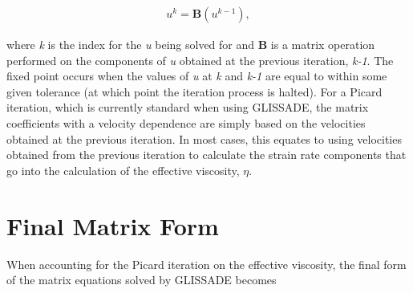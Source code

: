 \begin{align*}
u^{k}=\mathbf{B}\left( u^{k-1} \right),
\end{align*}

where \textit{k} is the index for the \textit{u} being solved for and \textbf{B} is a matrix operation performed on the components of \textit{u} obtained at the previous iteration, \textit{k-1}. The fixed point occurs when the values of \textit{u} at \textit{k} and \textit{k-1} are equal to within some given tolerance (at which point the iteration process is halted). %
For a Picard iteration, which is currently standard when using GLISSADE, the matrix coefficients with a velocity dependence are simply based on the velocities obtained at the previous iteration. In most cases, this equates to using velocities obtained from the previous iteration to calculate the strain rate components that go into the calculation of the effective viscosity, $\eta$.

\section{Final Matrix Form}
When accounting for %
the Picard iteration on the effective viscosity, the final form of the matrix equations solved by GLISSADE becomes 


